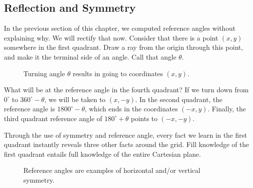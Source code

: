 \subsection{Reflection and Symmetry}
In the previous section of this chapter, we computed reference angles without
explaining why.  We will rectify that now.  Consider that there is a point $(x,y)$
somewhere in the first quadrant.  Draw a ray from the origin through this point,
and make it the terminal side of an angle.  Call that angle $\theta$.

\begin{figure}[h]
\begin{centering}
\caption{Turning angle $\theta$ results in going to coordinates $(x,y)$.}
\end{centering}
\end{figure}

What will be at the reference angle in the fourth quadrant?  If we turn
down from $0^\circ$ to $360^\circ-\theta$, we will be taken to $(x,-y)$.
In the second quadrant, the reference angle is $1800^\circ-\theta$, which
ends in the coordinates $(-x,y)$.  Finally, the third quadrant reference
angle of $180^\circ+\theta$ points to $(-x,-y)$.

Through the use of symmetry and reference angle, every fact we
learn in the first quadrant instantly reveals three other facts around
the grid.  Fill knowledge of the first quadrant entails full knowledge
of the entire Cartesian plane.

\begin{figure}[h]
\begin{centering}
\caption{Reference angles are examples of horizontal and/or vertical symmetry. }
\end{centering}
\end{figure}


